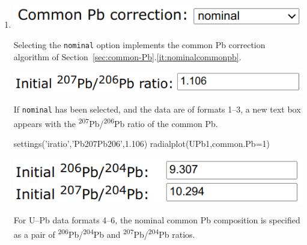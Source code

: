 \begin{refsection}
\begin{enumerate}
\begin{enumerate}
\item\begin{minipage}[t]{.4\linewidth}
  \strut\vspace*{-\baselineskip}\newline
  \includegraphics[width=\linewidth]{../figures/nominalcommonpb.png}
  \end{minipage}
  \begin{minipage}[t]{.6\linewidth}
    Selecting the \texttt{nominal} option implements the common Pb
    correction algorithm of
    Section~\ref{sec:common-Pb}.\ref{it:nominalcommonpb}.
  \end{minipage}

  \noindent\begin{minipage}[t]{.4\linewidth}
  \strut\vspace*{-\baselineskip}\newline
  \includegraphics[width=\linewidth]{../figures/initialPb76.png}
  \end{minipage}
  \begin{minipage}[t]{.6\linewidth}
    If \texttt{nominal} has been selected, and the data are of formats
    1--3, a new text box appears with the
    \textsuperscript{207}Pb/\textsuperscript{206}Pb ratio of the
    common Pb.
  \end{minipage}

\begin{script}
settings('iratio','Pb207Pb206',1.106)
radialplot(UPb1,common.Pb=1)
\end{script}

  \noindent\begin{minipage}[t]{.4\linewidth}
  \strut\vspace*{-\baselineskip}\newline
  \includegraphics[width=\linewidth]{../figures/initialPb764.png}
  \end{minipage}
  \begin{minipage}[t]{.6\linewidth}
    For U--Pb data formats 4--6, the nominal common Pb composition is specified
    as a pair of \textsuperscript{206}Pb/\textsuperscript{204}Pb and 
    \textsuperscript{207}Pb/\textsuperscript{204}Pb ratios.
  \end{minipage}


\end{enumerate}
\end{enumerate}
\end{refsection}
